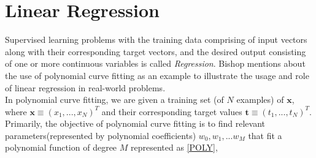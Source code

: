 \documentclass[12pt,twoside,a4paper]{article}
\title{\mytitle}
\author{\myauthors}
\date{\mydate}
\begin{document}
\maketitle

\begin{abstract}

In this day and age, automation is crucial in various industries which involve laborious and repetitive tasks. This project covers regression and classification problems, which are considered to be one of basic techniques of \textit{Pattern Recognition}. I've implemented linear models for regression, along with methods to optimize the parameters/weights of these models through the use of \textit{Maximum Likelihood Estimation} and \textit{Maximum A Posteriori Estimation}. Additonally, for classification models I've implemented the Fisher projection algorithm for the \textit{Taiji} dataset. I've also introduced the key aspects of the \textit{Central Limit Theorem}, in addition to answering few questions regarding estimating probability distributions.

\end{abstract}
\vspace{1ex}

\tableofcontents


\section{Linear Regression}

Supervised learning problems with the training data comprising of input vectors along with their corresponding target vectors, and the desired output consisting of one or more continuous variables is called \textit{Regression}. Bishop\cite{ChrisPRML} mentions about the use of polynomial curve fitting as an example to illustrate the usage and role of linear regression in real-world problems.\\
In polynomial curve fitting, we are given a training set (of $N$ examples) of $\textbf{x}$, where $\textbf{x} \equiv (x_1,...,x_N)^T$ and their corresponding target values $\textbf{t} \equiv (t_1,...,t_N)^T$.\\
Primarily, the objective of polynomial curve fitting is to find relevant parameters(represented by polynomial coefficients) $w_0, w_1, ... w_M$ that fit a polynomial function of degree $M$ represented as \ref{POLY},
\end{document}
